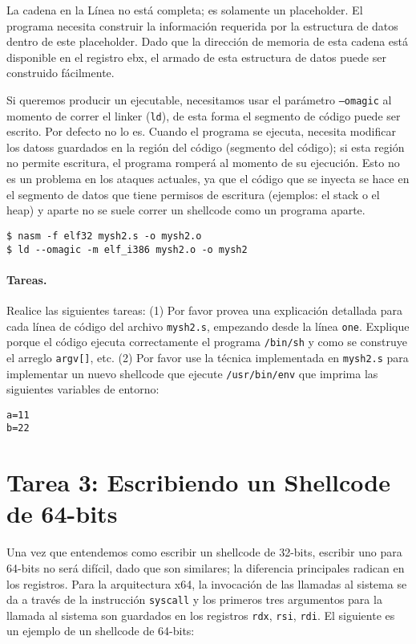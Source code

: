La cadena en la Línea  no está completa; es solamente un placeholder.
El programa necesita construir la información requerida por la estructura de datos dentro de este placeholder. Dado que la dirección de memoria de esta cadena está disponible en el registro ebx, el armado de esta estructura de datos puede ser  construido fácilmente.

Si queremos producir un ejecutable, necesitamos usar el parámetro  \texttt{--omagic} al momento de correr el linker (\texttt{ld}), de esta forma el segmento de código puede ser escrito. Por defecto no lo es.
Cuando el programa se ejecuta, necesita modificar los datoss guardados en la región del código (segmento del código); si esta región no permite escritura, el programa romperá al momento de su ejecución.
Esto no es un problema en los ataques actuales, ya que el código que se inyecta se hace en el segmento de datos que tiene permisos de escritura (ejemplos: el stack o el heap) y aparte no se suele correr un shellcode como un programa aparte.

\begin{lstlisting}
$ nasm -f elf32 mysh2.s -o mysh2.o
$ ld --omagic -m elf_i386 mysh2.o -o mysh2
\end{lstlisting}


\paragraph{Tareas.} Realice las siguientes tareas:
(1) Por favor provea una explicación detallada para cada línea de código del archivo \texttt{mysh2.s}, empezando desde la línea \texttt{one}.
Explique porque el código ejecuta correctamente el programa \texttt{/bin/sh} y como se construye el arreglo \texttt{argv[]}, etc.
(2) Por favor use la técnica implementada en \texttt{mysh2.s} para implementar un nuevo shellcode que ejecute \texttt{/usr/bin/env} que imprima las siguientes variables de entorno:

\begin{lstlisting}
a=11
b=22
\end{lstlisting}


\section{Tarea 3: Escribiendo un Shellcode de 64-bits}

Una vez que entendemos como escribir un shellcode de 32-bits, escribir uno para 64-bits no será difícil, dado que son similares; la diferencia principales radican en los registros.
Para la arquitectura x64, la invocación de las llamadas al sistema se da a través de la instrucción \texttt{syscall} y los primeros tres argumentos para la llamada al sistema son guardados en los registros \texttt{rdx}, \texttt{rsi}, 
\texttt{rdi}.
El siguiente es un ejemplo de un shellcode de 64-bits:

